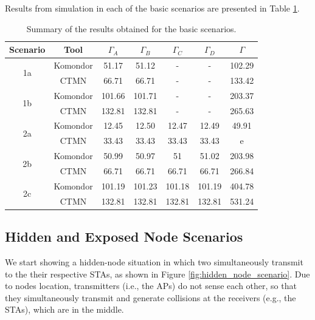 \documentclass[a4paper]{article}
\begin{document}
	Results from simulation in each of the basic scenarios are presented in Table \ref{table:basic_scenarios}.
	\begin{table}[h!]
		\centering
		\begin{tabular}{|c|c|c|c|c|c|c|}
			\hline
			\textbf{Scenario} & \textbf{Tool} & $\Gamma_A$ & $\Gamma_B$ & $\Gamma_C$ & $\Gamma_D$ & $\Gamma$ \\ \hline
			\multirow{2}{*}{1a} & Komondor & 51.17 & 51.12 & - & - & 102.29 \\ \cline{2-7} 
			& CTMN & 66.71 & 66.71 & - & - & 133.42 \\ \hline
			\multirow{2}{*}{1b} & Komondor & 101.66  & 101.71 & - & - & 203.37 \\ \cline{2-7} 
			& CTMN & 132.81 & 132.81 & - & - & 265.63 \\ \hline
			\multirow{2}{*}{2a} & Komondor & 12.45 & 12.50 & 12.47 & 12.49 & 49.91 \\ \cline{2-7} 
			& CTMN & 33.43 & 33.43 & 33.43 & 33.43 & e \\ \hline
			\multirow{2}{*}{2b} & Komondor & 50.99 & 50.97 & 51 & 51.02 & 203.98 \\ \cline{2-7} 
			& CTMN & 66.71 & 66.71 & 66.71 & 66.71 & 266.84 \\ \hline
			\multirow{2}{*}{2c} & Komondor & 101.19 & 101.23 & 101.18 & 101.19 & 404.78 \\ \cline{2-7} 
			& CTMN & 132.81 & 132.81 & 132.81 & 132.81 & 531.24 \\ \hline
		\end{tabular}
		\caption{Summary of the results obtained for the basic scenarios.}
		\label{table:basic_scenarios}
	\end{table}	
	
	\subsection{Hidden and Exposed Node Scenarios}
	\label{section:validations_hidden_exposed}
	We start showing a hidden-node situation in which two simultaneously transmit to the their respective STAs, as shown in Figure \ref{fig:hidden_node_scenario}. Due to nodes location, transmitters (i.e., the APs) do not sense each other, so that they simultaneously transmit and generate collisions at the receivers (e.g., the STAs), which are in the middle. 
	
\end{document}
